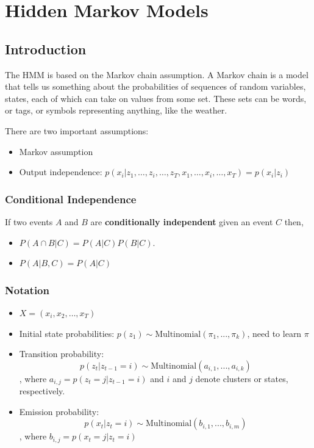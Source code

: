 \chapter{Hidden Markov Models}
\section{Introduction}
The HMM is based on the Markov chain assumption. A Markov chain is a model
that tells us something about the probabilities of sequences of random variables,
states, each of which can take on values from some set. These sets can be words, or
tags, or symbols representing anything, like the weather.

There are two important assumptions:
\begin{itemize}
	\item Markov assumption
	\item Output independence: $p(x_i|z_1,\dots,z_i,\dots,z_T,x_1,\dots,x_i,\dots,x_T) = p(x_i|z_i)$
\end{itemize}

\subsection{Conditional Independence}
If two events $A$ and $B$ are \textbf{conditionally independent} given an event $C$ then,
\begin{itemize}
	\item $P(A\cap B|C) = P(A|C)P(B|C)$. 
	\item $P(A|B,C) = P(A|C)$
\end{itemize}

\subsection{Notation}

\begin{itemize}
	\item $X = (x_i, x_2,\dots, x_T)$
	\item Initial state probabilities: $p(z_1) \sim \textrm{Multinomial}(\pi_1,...,\pi_k)$, need to learn $\pi$
	\item Transition probability:
	$$p(z_t|z_{t-1}=i)\sim \textrm{Multinomial}(a_{i,1},...,a_{i,k})$$
	, where $a_{i,j} = p(z_t=j|z_{t-1}=i)$ and $i$ and $j$ denote clusters or states, respectively.
	\item Emission probability:
	$$p(x_t|z_{t}=i)\sim \textrm{Multinomial}(b_{i,1},...,b_{i,m})$$
	, where $b_{i,j} = p(x_t=j|z_{t}=i)$
\end{itemize}


